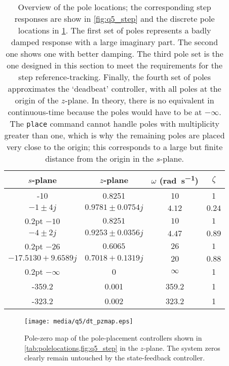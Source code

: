 \begin{table}
    \centering
    \caption{Overview of the pole locations; the corresponding step responses are show in \cref{fig:q5_step} and the discrete pole locations in \cref{fig:q5_pzmap}. The first set of poles represents a badly damped response with a large imaginary part. The second one shows one with better damping. The third pole set is the one designed in this section to meet the requirements for the step reference-tracking. Finally, the fourth set of poles approximates the `deadbeat' controller, with all poles at the origin of the $z$-plane. In theory, there is no equivalent in continuous-time because the poles would have to be at $-\infty$. The \texttt{place} command cannot handle poles with multiplicity greater than one, which is why the remaining poles are placed very close to the origin; this corresponds to a large but finite distance from the origin in the $s$-plane.}
    \label{tab:polelocations}
    \begin{tabular}{cccc}
       \toprule 
       $s$-plane & $z$-plane & $\omega$ (\si{\radian\per\second}) & $\zeta$ \\
       \toprule
       -10 & 0.8251 & 10 & 1 \\ 
       $-1\pm4j$ & $0.9781 \pm 0.0754j$ & $4.12$ & $0.24$ \\ 
       \midrule{0.2pt}
       $-10$ & $0.8251$ & $10$ & $1$ \\ 
       $-4\pm2j$ & $ 0.9253 \pm 0.0356j$ & $ 4.47$ & $ 0.89$ \\ 
       \midrule{0.2pt}
       $-26$ & $0.6065$ & $26$ & $1$ \\ 
       $-17.5130 + 9.6589j$ & $0.7018 + 0.1319j$ & $ 20$ & $ 0.88$ \\ 
       \midrule{0.2pt}
        $-\infty$ & 0 & $\infty$ & 1 \\
        -359.2 & 0.001 & 359.2 & 1 \\
        -323.2 & 0.002 & 323.2 & 1 \\
       \bottomrule
    \end{tabular}
\end{table}
\begin{figure}[ht]
    \centering
    \texttt{[image: media/q5/dt\_pzmap.eps]}
    \caption{Pole-zero map of the pole-placement controllers shown in \cref{tab:polelocations,fig:q5_step} in the $z$-plane. The system zeros clearly remain untouched by the state-feedback controller.}
    \label{fig:q5_pzmap}
\end{figure}
\FloatBarrier
